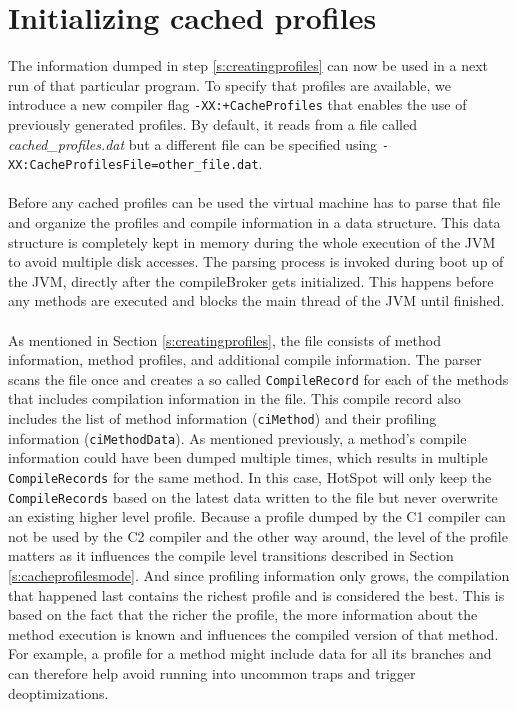 \section{Initializing cached profiles}
\label{s:initializingprofiles}
The information dumped in step \ref{s:creatingprofiles} can now be used in a next run of that particular program.
To specify that profiles are available, we introduce a new compiler flag \texttt{-XX:+CacheProfiles} that enables the use of previously generated profiles. By default, it reads from a file called \textit{cached\_profiles.dat} but a different file can be specified using \texttt{-XX:CacheProfilesFile=other\_file.dat}.
\\\\
Before any cached profiles can be used the virtual machine has to parse that file and organize the profiles and compile information in a data structure. This data structure is completely kept in memory during the whole execution of the JVM to avoid multiple disk accesses.
The parsing process is invoked during boot up of the JVM, directly after the compileBroker gets initialized. This happens before any methods are executed and blocks the main thread of the JVM until finished.
\\\\
As mentioned in Section \ref{s:creatingprofiles}, the file consists of method information, method profiles, and additional compile information. The parser scans the file once and creates a so called \texttt{CompileRecord} for each of the methods that includes compilation information in the file. This compile record also includes the list of method information (\texttt{ciMethod}) and their profiling information (\texttt{ciMethodData}).
As mentioned previously, a method's compile information could have been dumped multiple times, which results in multiple \texttt{CompileRecords} for the same method. In this case, HotSpot will only keep the \texttt{CompileRecords} based on the latest data written to the file but never overwrite an existing higher level profile.
Because a profile dumped by the C1 compiler can not be used by the C2 compiler and the other way around, the level of the profile matters as it influences the compile level transitions described in Section \ref{s:cacheprofilesmode}.
And since profiling information only grows, the compilation that happened last contains the richest profile and is considered the best.
This is based on the fact that the richer the profile, the more information about the method execution is known and influences the compiled version of that method. For example, a profile for a method might include data for all its branches and can therefore help avoid running into uncommon traps and trigger deoptimizations.
